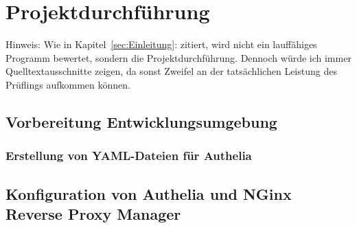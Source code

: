 \section{Projektdurchführung} 
\label{sec:Projektdurchführung}

Hinweis: Wie in Kapitel~\ref{sec:Einleitung}:  zitiert, 
wird nicht ein lauffähiges Programm bewertet, sondern die Projektdurchführung. 
Dennoch würde ich immer Quelltextausschnitte zeigen, da sonst Zweifel an der 
tatsächlichen Leistung des Prüflings aufkommen können.

\subsection{Vorbereitung Entwicklungsumgebung}
\label{Vorbereitung der Entwicklungsumgebung}

\subsubsection{Erstellung von YAML-Dateien für Authelia}
\label{Erstellung von YAML-Dateien für Authelia}

\subsection{Konfiguration von Authelia und NGinx Reverse Proxy Manager}
\label{Konfiguration von Authelia und NGinx Reverse Proxy Manager}